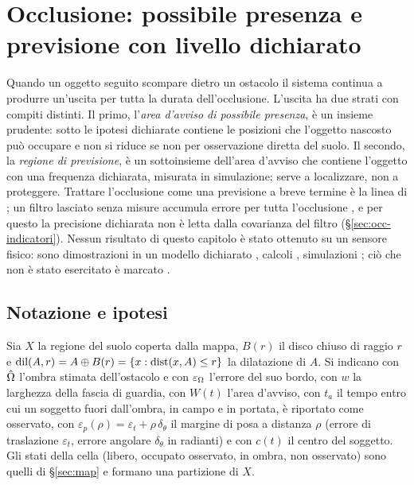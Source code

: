 \section{Occlusione: possibile presenza e previsione con livello dichiarato}\label{sec:occ}

Quando un oggetto seguito scompare dietro un ostacolo il sistema continua a produrre un'uscita per tutta la durata dell'occlusione. L'uscita ha due strati con compiti distinti. Il primo, l'\emph{area d'avviso di possibile presenza}, è un insieme prudente: sotto le ipotesi dichiarate contiene le posizioni che l'oggetto nascosto può occupare e non si riduce se non per osservazione diretta del suolo. Il secondo, la \emph{regione di previsione}, è un sottoinsieme dell'area d'avviso che contiene l'oggetto con una frequenza dichiarata, misurata in simulazione; serve a localizzare, non a proteggere. Trattare l'occlusione come una previsione a breve termine è la linea di \cite{khurana2021}; un filtro lasciato senza misure accumula errore per tutta l'occlusione \cite{cao2023}, e per questo la precisione dichiarata non è letta dalla covarianza del filtro (\S\ref{sec:occ-indicatori}). Nessun risultato di questo capitolo è stato ottenuto su un sensore fisico: sono dimostrazioni in un modello dichiarato , calcoli , simulazioni ; ciò che non è stato esercitato è marcato .

\subsection{Notazione e ipotesi}\label{sec:occ-ipotesi}

Sia $X$ la regione del suolo coperta dalla mappa, $B(r)$ il disco chiuso di raggio $r$ e $\operatorname{dil}(A,r)=A\oplus B(r)=\{x:\operatorname{dist}(x,A)\le r\}$ la dilatazione di $A$. Si indicano con $\hat{\Omega}$ l'ombra stimata dell'ostacolo e con $\varepsilon_\Omega$ l'errore del suo bordo, con $w$ la larghezza della fascia di guardia, con $W(t)$ l'area d'avviso, con $t_a$ il tempo entro cui un soggetto fuori dall'ombra, in campo e in portata, è riportato come osservato, con $\varepsilon_p(\rho)=\varepsilon_t+\rho\,\delta_\theta$ il margine di posa a distanza $\rho$ (errore di traslazione $\varepsilon_t$, errore angolare $\delta_\theta$ in radianti) e con $c(t)$ il centro del soggetto. Gli stati della cella (libero, occupato osservato, in ombra, non osservato) sono quelli di \S\ref{sec:map} e formano una partizione di $X$.

